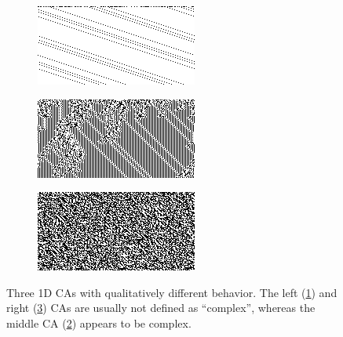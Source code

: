 \begin{figure}[htbp]
  \centering
  \begin{subfigure}[b]{.31\linewidth}
    \centering
    \includegraphics[width=\linewidth]{figures/three_simple_eca.png}
    \caption{}
   \label{fig:simple}
  \end{subfigure}
  \begin{subfigure}[b]{.31\linewidth}
    \centering
    \includegraphics[width=\linewidth]{figures/three_complex_eca.png}
    \caption{}
   \label{fig:complex}
  \end{subfigure}
  \begin{subfigure}[b]{.31\linewidth}
    \centering
    \includegraphics[width=\linewidth]{figures/three_random_eca.png}
    \caption{}
   \label{fig:random}
  \end{subfigure}
  \caption{Three 1D \aclp{CA} with qualitatively different behavior. The left
    (\ref{fig:simple}) and right (\ref{fig:random}) \acp{CA} are usually not
    defined as ``complex'', whereas the middle \ac{CA} (\ref{fig:complex})
    appears to be complex.}
  \label{fig:three_eca_complex}
\end{figure}

